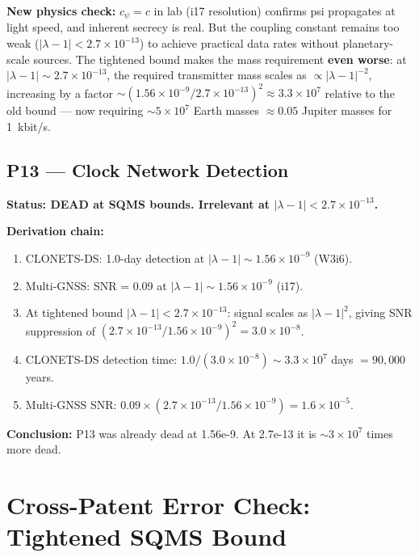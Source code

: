 \documentclass[11pt]{article}
\begin{document}
\textbf{New physics check:} $c_\psi = c$ in lab (i17 resolution) confirms psi propagates at light speed, and inherent secrecy is real. But the coupling constant remains too weak ($|\lambda-1| < 2.7 \times 10^{-13}$) to achieve practical data rates without planetary-scale sources. The tightened bound makes the mass requirement \textbf{even worse}: at $|\lambda-1| \sim 2.7 \times 10^{-13}$, the required transmitter mass scales as $\propto |\lambda-1|^{-2}$, increasing by a factor $\sim (1.56 \times 10^{-9} / 2.7 \times 10^{-13})^2 \approx 3.3 \times 10^{7}$ relative to the old bound --- now requiring $\sim 5 \times 10^7$ Earth masses $\approx 0.05$ Jupiter masses for 1~kbit/s.

\subsection{P13 --- Clock Network Detection}

\textbf{Status: DEAD at SQMS bounds. Irrelevant at $|\lambda-1| < 2.7 \times 10^{-13}$.}

\textbf{Derivation chain:}
\begin{enumerate}
\item CLONETS-DS: 1.0-day detection at $|\lambda-1| \sim 1.56 \times 10^{-9}$ (W3i6).
\item Multi-GNSS: SNR = 0.09 at $|\lambda-1| \sim 1.56 \times 10^{-9}$ (i17).
\item At tightened bound $|\lambda-1| < 2.7 \times 10^{-13}$: signal scales as $|\lambda-1|^2$, giving SNR suppression of $(2.7 \times 10^{-13}/1.56 \times 10^{-9})^2 = 3.0 \times 10^{-8}$.
\item CLONETS-DS detection time: $1.0 / (3.0 \times 10^{-8}) \sim 3.3 \times 10^7$ days $= 90{,}000$ years.
\item Multi-GNSS SNR: $0.09 \times (2.7 \times 10^{-13}/1.56 \times 10^{-9}) = 1.6 \times 10^{-5}$.
\end{enumerate}

\textbf{Conclusion:} P13 was already dead at 1.56e-9. At 2.7e-13 it is $\sim 3 \times 10^7$ times more dead.

\section{Cross-Patent Error Check: Tightened SQMS Bound}
\end{document}
